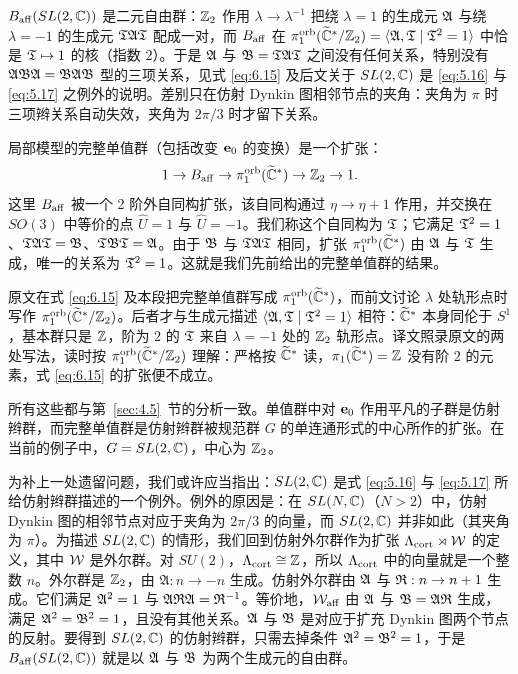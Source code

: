 \begin{yizhu}[物理图像补充]$B_{\rm aff}(SL(2,{\mathbb{C}}))$ 是二元自由群：${\mathbb{Z}}_2$ 作用 $\lambda\to\lambda^{-1}$ 把绕 $\lambda=1$ 的生成元 $\mathfrak{A}$ 与绕 $\lambda=-1$ 的生成元 $\mathfrak{T}\mathfrak{A}\mathfrak{T}$ 配成一对，而 $B_{\rm aff}$ 在 $\pi_1^{\rm orb}(\widetilde{{\mathbb{C}}}^*/{\mathbb{Z}}_2)=\langle\mathfrak{A},\mathfrak{T}\mid\mathfrak{T}^2=1\rangle$ 中恰是 $\mathfrak{T}\mapsto1$ 的核（指数 $2$）。于是 $\mathfrak{A}$ 与 $\mathfrak{B}=\mathfrak{T}\mathfrak{A}\mathfrak{T}$ 之间没有任何关系，特别没有 $\mathfrak{A}\mathfrak{B}\mathfrak{A}=\mathfrak{B}\mathfrak{A}\mathfrak{B}$ 型的三项关系，见式 \eqref{eq:6.15} 及后文关于 $SL(2,{\mathbb{C}})$ 是 \eqref{eq:5.16} 与 \eqref{eq:5.17} 之例外的说明。差别只在仿射 Dynkin 图相邻节点的夹角：夹角为 $\pi$ 时三项辫关系自动失效，夹角为 $2\pi/3$ 时才留下关系。\end{yizhu}


局部模型的完整单值群（包括改变 ${\bf e}_0$ 的变换）是一个扩张：
\setcounter{equation}{14}
\begin{equation}\label{eq:6.15}
  1\to B_{\rm aff}\to \pi_1^{\rm orb}(\widetilde{{\mathbb{C}}}^*)\to {\mathbb{Z}}_2\to 1.
\end{equation}
这里 $B_{\rm aff}$ 被一个 2 阶外自同构扩张，该自同构通过 $\eta\to\eta+1$ 作用，并交换在 $SO(3)$ 中等价的点 $\hat U=1$ 与 $\hat U=-1$。我们称这个自同构为 $\mathfrak{T}$；它满足 $\mathfrak{T}^2=1$、$\mathfrak{T}\mathfrak{A}\mathfrak{T}=\mathfrak{B}$、$\mathfrak{T}\mathfrak{B}\mathfrak{T}=\mathfrak{A}$。由于 $\mathfrak{B}$ 与 $\mathfrak{T}\mathfrak{A}\mathfrak{T}$ 相同，扩张 $\pi_1^{\rm orb}(\widetilde{{\mathbb{C}}}^*)$ 由 $\mathfrak{A}$ 与 $\mathfrak{T}$ 生成，唯一的关系为 $\mathfrak{T}^2=1$。这就是我们先前给出的完整单值群的结果。

\begin{yizhu}[原文疑误]原文在式 \eqref{eq:6.15} 及本段把完整单值群写成 $\pi_1^{\rm orb}(\widetilde{{\mathbb{C}}}^*)$，而前文讨论 $\lambda$ 处轨形点时写作 $\pi_1^{\rm orb}(\widetilde{{\mathbb{C}}}^*/{\mathbb{Z}}_2)$。后者才与生成元描述 $\langle\mathfrak{A},\mathfrak{T}\mid\mathfrak{T}^2=1\rangle$ 相符：$\widetilde{{\mathbb{C}}}^*$ 本身同伦于 $S^1$，基本群只是 ${\mathbb{Z}}$，阶为 $2$ 的 $\mathfrak{T}$ 来自 $\lambda=-1$ 处的 ${\mathbb{Z}}_2$ 轨形点。译文照录原文的两处写法，读时按 $\pi_1^{\rm orb}(\widetilde{{\mathbb{C}}}^*/{\mathbb{Z}}_2)$ 理解：严格按 $\widetilde{{\mathbb{C}}}^*$ 读，$\pi_1(\widetilde{{\mathbb{C}}}^*)={\mathbb{Z}}$ 没有阶 $2$ 的元素，式 \eqref{eq:6.15} 的扩张便不成立。\end{yizhu}

所有这些都与第~\ref{sec:4.5}~节的分析一致。单值群中对 ${\bf e}_0$ 作用平凡的子群是仿射辫群，而完整单值群是仿射辫群被规范群 $G$ 的单连通形式的中心所作的扩张。在当前的例子中，$G=SL(2,{\mathbb{C}})$，中心为 ${\mathbb{Z}}_2$。

为补上一处遗留问题，我们或许应当指出：$SL(2,{\mathbb{C}})$ 是式 \eqref{eq:5.16} 与 \eqref{eq:5.17} 所给仿射辫群描述的一个例外。例外的原因是：在 $SL(N,{\mathbb{C}})$（$N>2$）中，仿射 Dynkin 图的相邻节点对应于夹角为 $2\pi/3$ 的向量，而 $SL(2,{\mathbb{C}})$ 并非如此（其夹角为 $\pi$）。为描述 $SL(2,{\mathbb{C}})$ 的情形，我们回到仿射外尔群作为扩张 $\Lambda_{\rm cort}\rtimes {\mathcal W}$ 的定义，其中 ${\mathcal W}$ 是外尔群。对 $SU(2)$，$\Lambda_{\rm cort}\cong{\mathbb{Z}}$，所以 $\Lambda_{\rm cort}$ 中的向量就是一个整数 $n$。外尔群是 ${\mathbb{Z}}_2$，由 ${\mathfrak{A}}:n\to -n$ 生成。仿射外尔群由 $\mathfrak{A}$ 与 $\mathfrak{R}:n\to n+1$ 生成。它们满足 ${\mathfrak{A}}^2=1$ 与 $\mathfrak{A} \mathfrak{R}\mathfrak{A}=\mathfrak{R}^{-1}$。等价地，${\mathcal W}_{\rm aff}$ 由 $\mathfrak{A}$ 与 $\mathfrak{B}=\mathfrak{A}
\mathfrak{R}$ 生成，满足 $\mathfrak{A}^2=\mathfrak{B}^2=1$，且没有其他关系。$\mathfrak{A}$ 与 $\mathfrak{B}$ 是对应于扩充 Dynkin 图两个节点的反射。要得到 $SL(2,{\mathbb{C}})$ 的仿射辫群，只需去掉条件 $\mathfrak{A}^2=\mathfrak{B}^2=1$，于是 $B_{\rm aff}(SL(2,{\mathbb{C}}))$ 就是以 $\mathfrak{A}$ 与 $\mathfrak{B}$ 为两个生成元的自由群。

